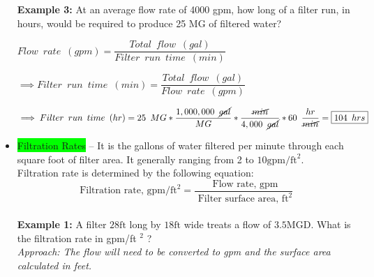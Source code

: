 \begin{itemize}
 

\vspace{0.3cm}

\textbf{Example 3:}  At an average flow rate of 4000 gpm, how long of a filter run, in hours, would be required to produce 25 MG of filtered water?\\

\vspace{0.2cm}

$Flow \enspace rate \enspace (gpm)=\dfrac{Total \enspace flow \enspace (gal)}{Filter \enspace run \enspace time \enspace (min)}$

\vspace{0.3cm}

$\implies Filter \enspace run \enspace time \enspace (min)=\dfrac{Total \enspace flow \enspace (gal)}{Flow \enspace rate \enspace (gpm)}$\\

\vspace{0.3cm}

$\implies Filter \enspace run \enspace time \enspace (hr)=25 \enspace MG*\dfrac{1,000,000 \enspace \cancel{gal}}{MG}*\dfrac{\cancel{min}}{4,000 \enspace \cancel{gal}}*60 \enspace \dfrac{hr}{\cancel{min}}=\boxed{104 \enspace hrs}$

 

 

\item \colorbox{lime}{Filtration Rates} – It is the gallons of water filtered per minute through each square foot of filter area.  It generally ranging from 2 to $10 \mathrm{gpm} / \mathrm{ft}^{2}$.\\

Filtration rate is determined by the following equation:\\
$$
\text { Filtration rate, } \mathrm{gpm} / \mathrm{ft}^{2}=\frac{\text { Flow rate, } \mathrm{gpm}}{\text { Filter surface area, } \mathrm{ft}^{2}}
$$\\

\textbf{Example 1:} A filter $28 \mathrm{ft}$ long by $18 \mathrm{ft}$ wide treats a flow of $3.5 \mathrm{MGD}$. What is the filtration rate in gpm/ft ${ }^{2}$ ?\\

\vspace{0.2cm}
\textit{Approach:  The flow will need to be converted to gpm and the surface area calculated in feet.}\\


\end{itemize}
